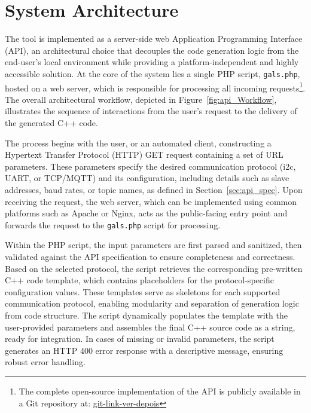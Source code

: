 
\section{System Architecture}
\label{sec:design_decisions}

The tool is implemented as a server-side web Application Programming Interface (API), an architectural choice that decouples the code generation logic from the end-user's local environment while providing a platform-independent and highly accessible solution. At the core of the system lies a single PHP script, \texttt{gals.php}, hosted on a web server, which is responsible for processing all incoming requests\footnote{The complete open-source implementation of the API is publicly available in a Git repository at: \url{git-link-ver-depois}}. The overall architectural workflow, depicted in Figure~\ref{fig:api_Workflow}, illustrates the sequence of interactions from the user's request to the delivery of the generated C++ code.

The process begins with the user, or an automated client, constructing a Hypertext Transfer Protocol (HTTP) GET request containing a set of URL parameters. These parameters specify the desired communication protocol (\gls{i2c}, UART, or TCP/MQTT) and its configuration, including details such as slave addresses, baud rates, or topic names, as defined in Section~\ref{sec:api_spec}. Upon receiving the request, the web server, which can be implemented using common platforms such as Apache or Nginx, acts as the public-facing entry point and forwards the request to the \texttt{gals.php} script for processing.

Within the PHP script, the input parameters are first parsed and sanitized, then validated against the API specification to ensure completeness and correctness. Based on the selected protocol, the script retrieves the corresponding pre-written C++ code template, which contains placeholders for the protocol-specific configuration values. These templates serve as skeletons for each supported communication protocol, enabling modularity and separation of generation logic from code structure. The script dynamically populates the template with the user-provided parameters and assembles the final C++ source code as a string, ready for integration. In cases of missing or invalid parameters, the script generates an HTTP 400 error response with a descriptive message, ensuring robust error handling.

